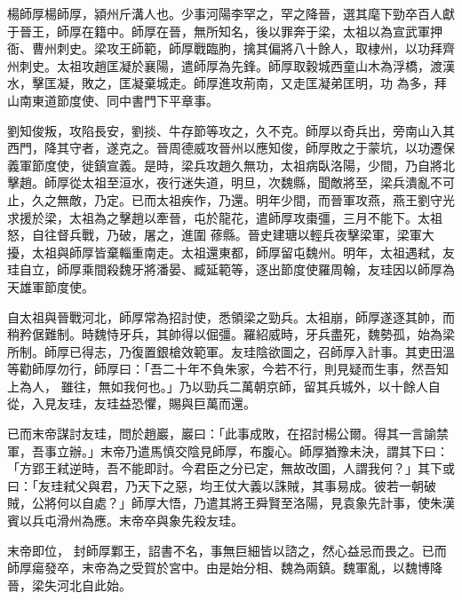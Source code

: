 
\begin{pinyinscope}

 楊師厚楊師厚，潁州斤溝人也。少事河陽李罕之，罕之降晉，選其麾下勁卒百人獻于晉王，師厚在籍中。師厚在晉，無所知名，後以罪奔于梁，太祖以為宣武軍押衙、曹州刺史。梁攻王師範，師厚戰臨朐，擒其偏將八十餘人，取棣州，以功拜齊州刺史。太祖攻趙匡凝於襄陽，遣師厚為先鋒。師厚取穀城西童山木為浮橋，渡漢水，擊匡凝，敗之，匡凝棄城走。師厚進攻荊南，又走匡凝弟匡明，功
 為多，拜山南東道節度使、同中書門下平章事。



 劉知俊叛，攻陷長安，劉掞、牛存節等攻之，久不克。師厚以奇兵出，旁南山入其西門，降其守者，遂克之。晉周德威攻晉州以應知俊，師厚敗之于蒙坑，以功遷保義軍節度使，徙鎮宣義。是時，梁兵攻趙久無功，太祖病臥洛陽，少間，乃自將北擊趙。師厚從太祖至洹水，夜行迷失道，明旦，次魏縣，聞敵將至，梁兵潰亂不可止，久之無敵，乃定。已而太祖疾作，乃還。明年少間，而晉軍攻燕，燕王劉守光求援於梁，太祖為之擊趙以牽晉，屯於龍花，遣師厚攻棗彊，三月不能下。太祖怒，自往督兵戰，乃破，屠之，進圍
 蓚縣。晉史建瑭以輕兵夜擊梁軍，梁軍大擾，太祖與師厚皆棄輜重南走。太祖還東都，師厚留屯魏州。明年，太祖遇弒，友珪自立，師厚乘間殺魏牙將潘晏、臧延範等，逐出節度使羅周翰，友珪因以師厚為天雄軍節度使。



 自太祖與晉戰河北，師厚常為招討使，悉領梁之勁兵。太祖崩，師厚遂逐其帥，而稍矜倨難制。時魏恃牙兵，其帥得以倔彊。羅紹威時，牙兵盡死，魏勢孤，始為梁所制。師厚已得志，乃復置銀槍效範軍。友珪陰欲圖之，召師厚入計事。其吏田溫等勸師厚勿行，師厚曰：「吾二十年不負朱家，今若不行，則見疑而生事，然吾知上為人，
 雖往，無如我何也。」乃以勁兵二萬朝京師，留其兵城外，以十餘人自從，入見友珪，友珪益恐懼，賜與巨萬而還。



 已而末帝謀討友珪，問於趙巖，巖曰：「此事成敗，在招討楊公爾。得其一言諭禁軍，吾事立辦。」末帝乃遣馬慎交陰見師厚，布腹心。師厚猶豫未決，謂其下曰：「方郢王弒逆時，吾不能即討。今君臣之分已定，無故改圖，人謂我何？」其下或曰：「友珪弒父與君，乃天下之惡，均王仗大義以誅賊，其事易成。彼若一朝破賊，公將何以自處？」師厚大悟，乃遣其將王舜賢至洛陽，見袁象先計事，使朱漢賓以兵屯滑州為應。末帝卒與象先殺友珪。



 末帝即位，
 封師厚鄴王，詔書不名，事無巨細皆以諮之，然心益忌而畏之。已而師厚瘍發卒，末帝為之受賀於宮中。由是始分相、魏為兩鎮。魏軍亂，以魏博降晉，梁失河北自此始。




\end{pinyinscope}
